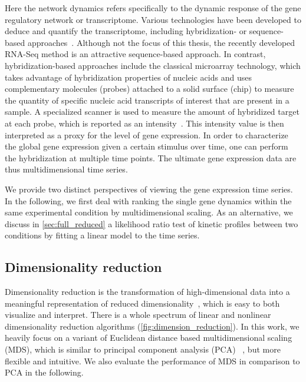 Here the network dynamics refers specifically to the dynamic response of the 
gene regulatory network or transcriptome. 
Various technologies have been 
developed to deduce and quantify the 
transcriptome, including hybridization- 
or sequence-based approaches~\citep{Wang2009}. 
Although not the focus of this thesis, the recently developed
RNA-Seq method is an attractive sequence-based approach.
In contrast,
hybridization-based approaches include the classical microarray
technology, which takes advantage of hybridization properties 
of nucleic acids and uses complementary molecules (probes) attached to a solid 
surface 
(chip) to measure the quantity of specific nucleic acid transcripts of 
interest that are present in a sample. A specialized scanner is used to 
measure the amount of hybridized target at each probe, which is reported as an 
intensity~\citep{Gentleman2005}. This intensity value is then interpreted as a
proxy for the level of gene expression. In order to characterize the global 
gene expression given a certain stimulus over time, one can perform the 
hybridization at multiple time points. The ultimate gene expression data are
thus multidimensional time series. 



We provide two distinct 
perspectives of viewing the gene expression time series.
In the following, we first deal with ranking the 
single gene dynamics within the same experimental condition by multidimensional
scaling.
As an alternative, we discuss in \ref{sec:full_reduced} a likelihood ratio test of kinetic profiles between two conditions
by fitting a linear model to the time series.

\subsection{Dimensionality reduction}
Dimensionality reduction is the transformation of high-dimensional data into 
a meaningful representation of reduced dimensionality~\citep{Maaten2009}, 
which is easy to both visualize and interpret. There is a whole spectrum of linear
and nonlinear dimensionality reduction algorithms 
(\ref{fig:dimension_reduction}). In this work, we heavily 
focus on a variant of Euclidean distance based multidimensional 
scaling (MDS), which is similar to principal component analysis (PCA)%
~\citep{Haerdle2003},
but more flexible and intuitive. We also evaluate the performance of MDS in comparison to 
PCA in the following.

